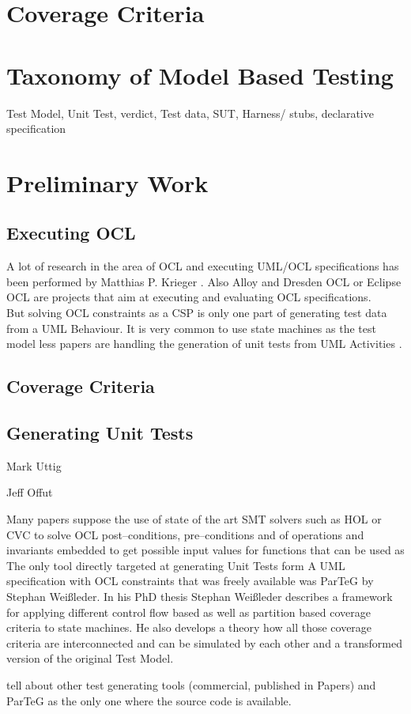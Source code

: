 \section{Coverage Criteria}
\section{Taxonomy of Model Based Testing}
Test Model,
Unit Test,
verdict,
Test data,
SUT,
Harness/ stubs,
declarative specification

\section{Preliminary Work}
\label{sec:RelatedWork}
\subsection{Executing OCL}
A lot of research in the area of OCL and executing UML/OCL specifications has been performed by Matthias P. Krieger \cite{krieger2008executingUnderspecifiedOCL}. Also Alloy and Dresden OCL or Eclipse OCL are projects that aim at executing and evaluating OCL specifications. \\
But solving OCL constraints as a CSP is only one part of generating test data from a UML Behaviour.
It is very common to use state machines as the test model less papers are handling the generation of unit tests from UML Activities\cite{Linzhang04GeneratingTestCasefromActivityGrayBoxMethod}
\cite{Patel12TestCaseFormationUsigUMLActivityDiagram}
\cite{Pechtanun12GeneratingTestCaseFromUMLActivityDiagramBasedOnACGrammar}
\cite{Xu09ModelCheckingUMLActivities}\cite{Xu09ModelCheckingUMLActivityDiagramsFDR}. 


\subsection{Coverage Criteria}



\subsection{Generating Unit Tests}
Mark Uttig

Jeff Offut

Many papers suppose the use of state of the art SMT solvers such as HOL or CVC to solve OCL post--conditions, pre--conditions and of operations and invariants embedded to get possible input values for functions that can be used as 
The only tool directly targeted at generating Unit Tests form A UML specification with OCL constraints that was freely available was ParTeG by Stephan Wei\ss leder. In his PhD thesis Stephan Wei\ss leder describes a framework for applying different control flow based as well as partition based coverage criteria to state machines. He also develops a theory how all those coverage criteria are interconnected and can be simulated by each other and a transformed version of the original Test Model\cite{ParTeG}.


tell about other test generating tools (commercial, published in Papers) and ParTeG as the only one where the source code is available.\cite{ParTeG}



